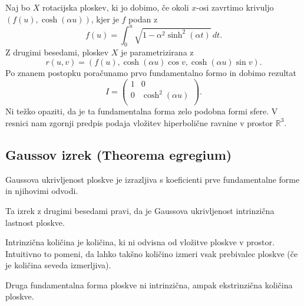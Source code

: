 \begin{primer}
Naj bo $X$ rotacijska ploskev, ki jo dobimo, če okoli $x$-osi zavrtimo krivuljo $(f(u), \cosh (\alpha u))$, kjer je $f$ podan z \begin{equation*}
f(u) = \int_{0}^{u} \sqrt{1 - \alpha^2 \sinh^2(\alpha t)}  \, dt. 
\end{equation*}
Z drugimi besedami, ploskev $X$ je parametrizirana z \begin{equation*}
r(u,v) = \left( f(u), \cosh(\alpha u) \cos v, \cosh(\alpha u) \sin v \right).
\end{equation*}  
Po znanem postopku poračunamo prvo fundamentalno formo in dobimo rezultat \begin{equation*}
    I = \begin{pmatrix}
        1 & 0\\
        0 & \cosh^2 (\alpha u)\\
    \end{pmatrix}.
\end{equation*}
Ni težko opaziti, da je ta fundamentalna forma zelo podobna formi sfere. V resnici nam zgornji predpis podaja vložitev hiperbolične ravnine v prostor $\mathbb{R}^3$. 
\end{primer}

\subsection{Gaussov izrek (Theorema egregium)}

\begin{izrek}
\label{izr_theorema_egregium}
Gaussova ukrivljenost ploskve je izrazljiva s koeficienti prve fundamentalne forme in njihovimi odvodi.
\end{izrek}

\begin{opomba}
Ta izrek z drugimi besedami pravi, da je Gaussova ukrivljenost intrinzična lastnost ploskve. 
\end{opomba}

\begin{definicija}
\label{def_intrinzicna_kolicina}
Intrinzična količina je količina, ki ni odvisna od vložitve ploskve v prostor. Intuitivno to pomeni, da lahko takšno količino izmeri vsak prebivalec ploskve (če je količina seveda izmerljiva).
\end{definicija}

\begin{opomba}
Druga fundamentalna forma ploskve ni intrinzična, ampak ekstrinzična količina ploskve.
\end{opomba}

